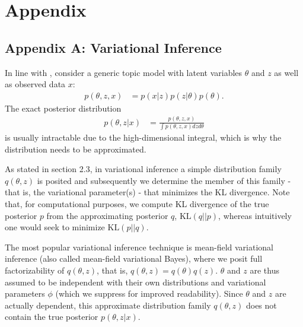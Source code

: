 \section{Appendix}

\subsection*{Appendix A: Variational Inference}

In line with \cite{wang2013variational}, consider a generic topic model with latent variables $\theta$ and $z$ as well as observed data $x$:
\begin{align*}
p(\theta,z,x) &= p(x|z)p(z|\theta)p(\theta).
\end{align*}
The exact posterior distribution
\begin{align*}
p(\theta,z|x) &= \frac{p(\theta,z,x)}{\int p(\theta,z,x)dzd\theta}
\end{align*}
is usually intractable due to the high-dimensional integral, which is why the distribution needs to be approximated.

As stated in section 2.3, in variational inference a simple distribution family $q(\theta,z)$ is posited and subsequently we determine the member of this family - that is, the variational parameter(s) - that minimizes the KL divergence. Note that, for computational purposes, we compute KL divergence of the true posterior $p$ from the approximating posterior $q$, $\text{KL}(q||p)$, whereas intuitively one would seek to minimize $\text{KL}(p||q)$.

The most popular variational inference technique is mean-field variational inference (also called mean-field variational Bayes), where we posit full factorizability of $q(\theta,z)$, that is, $q(\theta,z) = q(\theta)q(z)$. $\theta$ and $z$ are thus assumed to be independent with their own distributions and variational parameters $\phi$ (which we suppress for improved readability). Since $\theta$ and $z$ are actually dependent, this approximate distribution family $q(\theta,z)$ does not contain the true posterior $p(\theta,z|x)$.  


